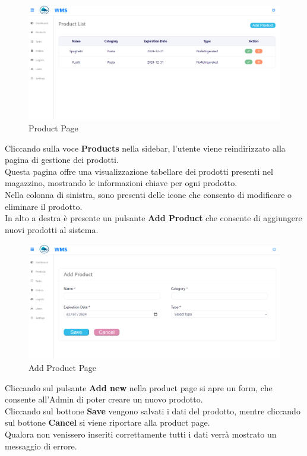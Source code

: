\begin{figure}[H]
    \centering
    \includegraphics[width=\textwidth]{document/sections/img/Storyboard/productPage.png}
    \caption{Product Page}
    \label{fig:productPages}
\end{figure}

Cliccando sulla voce \textbf{Products} nella sidebar, l'utente viene reindirizzato alla pagina di gestione dei prodotti.\\
Questa pagina offre una visualizzazione tabellare dei prodotti presenti nel magazzino,
mostrando le informazioni chiave per ogni prodotto.\\
Nella colonna di sinistra, sono presenti delle icone che consento di modificare o eliminare il prodotto.\\
In alto a destra è presente un pulsante \textbf{Add Product} che consente di aggiungere nuovi prodotti al sistema.

\begin{figure}[H]
    \centering
    \includegraphics[width=\textwidth]{document/sections/img/Storyboard/addProductPage.png}
    \caption{Add Product Page}
    \label{fig:addProductPages}
\end{figure}

Cliccando sul pulsante \textbf{Add new} nella product page si apre un form, che consente
all'Admin di poter creare un nuovo prodotto.\\
Cliccando sul bottone \textbf{Save} vengono salvati i dati del prodotto, mentre cliccando sul bottone \textbf{Cancel} si viene
riportare alla product page.\\
Qualora non venissero inseriti correttamente tutti i dati verrà mostrato un messaggio di errore.

